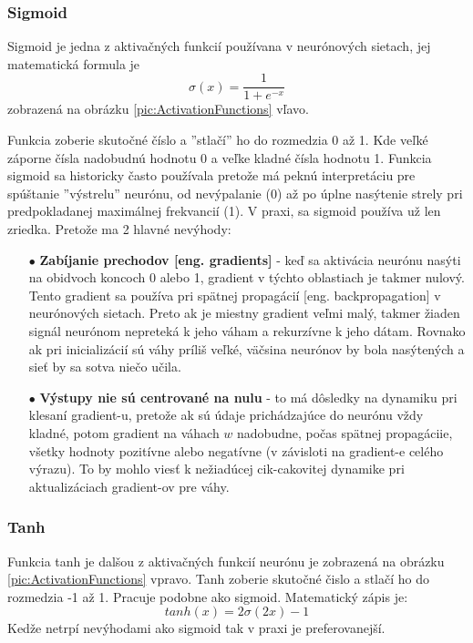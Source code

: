 \subsubsection{Sigmoid}
Sigmoid je jedna z aktivačných funkcií používana v neurónových sietach, jej matematická formula je
\begin{equation}
    \sigma(x) = \frac{1}{1 + e^{-x}}
\end{equation}
zobrazená na obrázku \ref{pic:ActivationFunctions} vľavo.

Funkcia zoberie skutočné číslo a ''stlačí'' ho do rozmedzia 0 až 1.
Kde veľké záporne čísla nadobudnú hodnotu 0 a veľke kladné čísla hodnotu 1.
Funkcia sigmoid sa historicky často používala pretože má peknú interpretáciu pre spúštanie ''výstrelu'' neurónu,
    od nevýpalanie (0) až po úplne nasýtenie strely pri predpokladanej maximálnej frekvancií (1).
V praxi, sa sigmoid používa už len zriedka.
Pretože ma 2 hlavné nevýhody\cite{odkaz:ConvolutionalNeuralNetworkCS231n}:
\begin{enumerate}
    \item[$\bullet$] \textbf{Zabíjanie prechodov [eng. gradients]} - keď sa aktivácia neurónu nasýti na obidvoch koncoch 0 alebo 1, gradient v týchto oblastiach je takmer nulový.
    Tento gradient sa používa pri spätnej propagácií [eng. backpropagation] v neurónových sietach. Preto ak je miestny gradient veľmi malý, takmer žiaden signál
    neurónom nepreteká k jeho váham a rekurzívne k jeho dátam. Rovnako ak pri inicializácií sú váhy príliš veľké, väčsina neurónov by bola nasýtených a sieť by sa sotva niečo učila.
    \item[$\bullet$] \textbf{Výstupy nie sú centrované na nulu} - to má dôsledky na dynamiku pri klesaní gradient-u, pretože ak sú údaje prichádzajúce do neurónu vždy kladné,
    potom gradient na váhach $w$ nadobudne, počas spätnej propagáciie, všetky hodnoty pozitívne alebo negatívne (v závisloti na gradient-e celého výrazu).
    To by mohlo viesť k nežiadúcej cik-cakovitej dynamike pri aktualizáciach gradient-ov pre váhy.
\end{enumerate}


\subsubsection{Tanh}
Funkcia tanh je dalšou z aktivačných funkcií neurónu je zobrazená na obrázku \ref{pic:ActivationFunctions} vpravo.
Tanh zoberie skutočné čislo a stlačí ho do rozmedzia -1 až 1. Pracuje podobne ako sigmoid.
Matematický zápis je\cite{odkaz:ConvolutionalNeuralNetworkCS231n}:
\begin{equation}
    tanh(x) = 2\sigma(2x) - 1
\end{equation}
Kedže netrpí nevýhodami ako sigmoid tak v praxi je preferovanejší.


